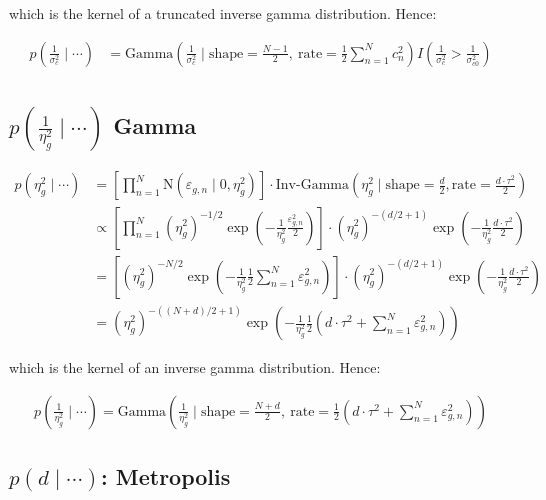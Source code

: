 \documentclass{article}\usepackage{graphicx, color}
\providecommand{\e}{\varepsilon}
\begin{document}
\begin{flushleft}
which is the kernel of a truncated inverse gamma distribution. Hence:

\begin{align*}
p \left ( \frac{1}{\sigma_c^2} \mid \cdots \right) &= \text{Gamma} \left ( \frac{1}{\sigma_c^2} \mid \text{shape} = \frac{N - 1}{2}, \ \text{rate} =\frac{1}{2} {\sum_{n = 1}^N c_n^2} \right )  I \left (\frac{1}{\sigma_c^2} > \frac{1}{\sigma_{c0}^2} \right ) \\
\end{align*}

\subsection{$p \left (\frac{1}{\eta_g^2} \mid \cdots \right )$ Gamma}

\begin{align*}
p(\eta_g^2 \mid \cdots) &= \left [ \prod_{n = 1}^N \text{N}(\e_{g, n} \mid 0, \eta_g^2) \right ] \cdot \text{Inv-Gamma} \left ( \eta_g^2 \mid \text{shape} = \frac{d }{2}, \text{rate} = \frac{d \cdot \tau^2}{2} \right ) \\ 
&\propto \left [ \prod_{n = 1}^N (\eta_g^{2})^{-1/2} \exp \left (- \frac{1}{ \eta_g^2} \frac{\e_{g, n}^2}{2} \right ) \right ] \cdot \left ( { \eta_g^2} \right )^{ -(d/2 + 1)} \exp \left (- \frac{1}{ \eta_g^2}\frac{d \cdot \tau^2}{2} \right ) \\
&=  \left [ (\eta_g^{2})^{-N/2} \exp \left (-\frac{1}{ \eta_g^2}  \frac{1}{2} \sum_{n = 1}^N \e_{g, n}^2 \right ) \right ] \cdot \left ( { \eta_g^2} \right )^{ -(d/2 + 1)} \exp \left (- \frac{1}{ \eta_g^2}\frac{d \cdot \tau^2}{2} \right ) \\
&=  (\eta_g^{2})^{-((N+d)/2 + 1)} \exp \left (-\frac{1}{ \eta_g^2}  \frac{1}{2} \left ( d \cdot \tau^2 + \sum_{n = 1}^N \e_{g, n}^2 \right ) \right ) 
\end{align*}

which is the kernel of an inverse gamma distribution. Hence:

\begin{align*}
p \left ( \frac{1}{\eta_g^2} \mid \cdots \right ) = \text{Gamma} \left (\frac{1}{\eta_g^2} \mid \text{shape} = \frac{N + d}{2}, \  \text{rate} = \frac{1}{2} \left ( d \cdot \tau^2 + \sum_{n  =1}^N \e_{g, n}^2 \right ) \right )
\end{align*}

\subsection{$p(d \mid \cdots)$: Metropolis}


\end{flushleft}
\end{document}
